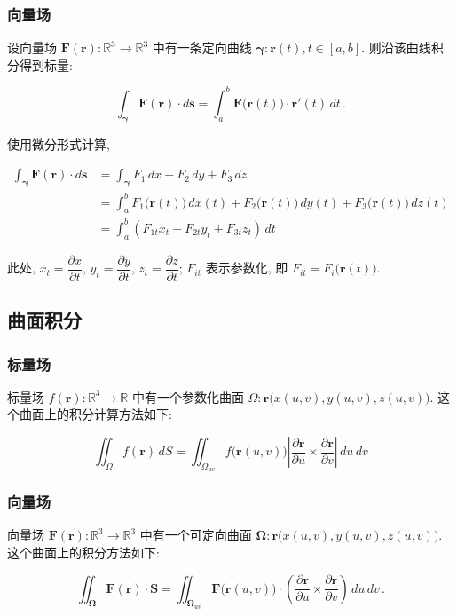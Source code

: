 \documentclass[UTF8]{ctexart}
\newcommand{\ve}[1]{\boldsymbol{\mathbf{#1}}}
\newcommand{\R}{\mathbb R}
\begin{document}
\subsubsection{向量场}
设向量场 $ \ve{F}(\ve{r}) : \R^3 \to \R^3 $ 中有一条定向曲线 $ \ve{\gamma}: \ve{r}(t), t \in [a, b] $. 则沿该曲线积分得到标量:
\begin{thmbox}
    \[ \int_{\ve{\gamma}} \ve{F} (\ve{r}) \cdot d\ve{s} = \int_{a}^{b} \ve{F} \big( \ve{r} (t) \big) \cdot \ve{r}'(t) \,dt \,.\]
\end{thmbox} 

使用微分形式计算, 
\begin{thmbox}
    \begin{align*}
        \int_{\ve{\gamma}} \ve{F} (\ve{r}) \cdot d\ve{s} &= \int_{\ve{\gamma}} F_1 \,dx + F_2 \,dy + F_3 \,dz \\ 
        &= \int_{a}^{b} F_1 \big( \ve{r} (t) \big) \, dx(t) + F_2 \big( \ve{r} (t) \big) \, dy(t) + F_3 \big( \ve{r} (t) \big) \, dz(t) \\
        &= \int_{a}^{b} (F_{1t} x_t + F_{2t} y_t + F_{3t} z_t) \,dt
    \end{align*}
\end{thmbox}

此处, $ x_t = \dfrac{\partial x}{\partial t} $, $ y_t = \dfrac{\partial y}{\partial t} $, $ z_t = \dfrac{\partial z}{\partial t} $; $ F_{it} $ 表示参数化, 即 $ F_{it} = F_i \big( \ve{r} (t) \big) $.

\subsection{曲面积分}
\subsubsection{标量场}
标量场 $ f (\ve{r}) : \R^3 \to \R $ 中有一个参数化曲面 $ \Omega: \ve{r}\big( x(u, v), y(u, v), z(u, v) \big) $. 这个曲面上的积分计算方法如下:
\begin{thmbox}
    \[ \iint_\Omega f(\ve{r}) \,dS = \iint_{\Omega_{uv}} f\big( \ve{r}(u, v) \big) \left| \dfrac{\partial \ve{r}}{\partial u} \times \dfrac{\partial \ve{r}}{\partial v} \right| \,du\,dv \]
\end{thmbox}

\subsubsection{向量场}
向量场 $ \ve{F} (\ve{r}) : \R^3 \to \R^3 $ 中有一个可定向曲面 $ \ve{\Omega}: \ve{r}\big( x(u, v), y(u, v), z(u, v) \big) $. 这个曲面上的积分方法如下:
\begin{thmbox}
    \[ \iint_{\ve{\Omega}} \ve{F} (\ve{r}) \cdot \ve{S} = \iint_{\ve{\Omega}_{uv}} \ve{F} \big( \ve{r} (u, v) \big) \cdot \left( \dfrac{\partial \ve{r}}{\partial u} \times \dfrac{\partial \ve{r}}{\partial v} \right) \,du\,dv \,.\]
\end{thmbox}
\end{document}
